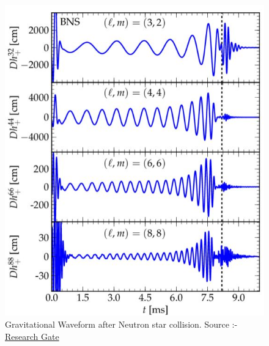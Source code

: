 \begin{figure}[h]
    \centering
    \includegraphics[scale=0.74]{images.tex/WAVEFORM.jpeg}
    \caption{Gravitational Waveform after Neutron star collision. Source :- \href{https://www.researchgate.net/figure/Binary-neutron-stars-GW-modes-m-3-2-4-4-6-6-8-8-of-polarization_fig13_233846764}{Research Gate}}
\end{figure}

\pagebreak
